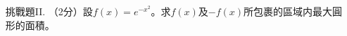 \documentclass[12pt]{article}
\begin{document}
\begin{enumerate}
        \hrulefill

        \hrulefill

        \hrulefill

        \hrulefill

        \hrulefill

        \hrulefill

        \hrulefill

        \hrulefill

        \hrulefill

        \hrulefill

        \hrulefill

        \hrulefill

        \hrulefill

        \hrulefill
        \item[挑戰題II.] （2分）設$f(x)=e^{-x^2}$。求$f(x)$及$-f(x)$所包裹的區域内最大圓形的面積。

        \hrulefill

        \hrulefill

        \hrulefill

        \hrulefill

        \hrulefill

        \hrulefill

        \hrulefill

        \hrulefill

        \hrulefill

        \hrulefill

        \hrulefill

        \hrulefill

        \hrulefill

        \hrulefill

        \hrulefill

        \hrulefill

        \hrulefill

        \hrulefill

        \hrulefill

        \hrulefill

        \hrulefill

        \hrulefill

        \hrulefill

        \hrulefill

        \hrulefill

        \hrulefill

        \hrulefill

        \hrulefill


\end{enumerate}
\end{document}
